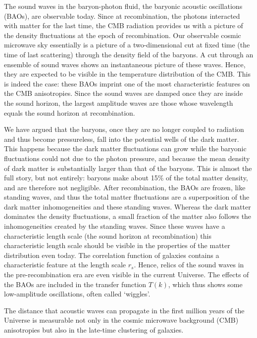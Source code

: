 \documentclass[a4paper,11pt]{article}
\begin{document}
{\noindent}The sound waves in the baryon-photon fluid, the baryonic acoustic oscillations (BAOs), are observable today. Since at recombination, the photons interacted with matter for the last time, the CMB radiation provides us with a picture of the density fluctuations at the epoch of recombination. Our observable cosmic microwave sky essentially is a picture of a two-dimensional cut at fixed time (the time of last scattering) through the density field of the baryons. A cut through an ensemble of sound waves shows an instantaneous picture of these waves. Hence, they are expected to be visible in the temperature distribution of the CMB. This is indeed the case: these BAOs imprint one of the most characteristic features on the CMB anisotropies. Since the sound waves are damped once they are inside the sound horizon, the largest amplitude waves are those whose wavelength equals the sound horizon at recombination.

{\noindent}We have argued that the baryons, once they are no longer coupled to radiation and thus become pressureless, fall into the potential wells of the dark matter. This happens because the dark matter fluctuations can grow while the baryonic fluctuations could not due to the photon pressure, and because the mean density of dark matter is substantially larger than that of the baryons. This is almost the full story, but not entirely: baryons make about 15\% of the total matter density, and are therefore not negligible. After recombination, the BAOs are frozen, like standing waves, and thus the total matter fluctuations are a superposition of the dark matter inhomogeneities and these standing waves. Whereas the dark matter dominates the density fluctuations, a small fraction of the matter also follows the inhomogeneities created by the standing waves. Since these waves have a characteristic length scale (the sound horizon at recombination) this characteristic length scale should be visible in the properties of the matter distribution even today. The correlation function of galaxies contains a characteristic feature at the length scale $r_s$. Hence, relics of the sound waves in the pre-recombination era are even visible in the current Universe. The effects of the BAOs are included in the transfer function $T(k)$, which thus shows some low-amplitude oscillations, often called `wiggles'.

{\noindent}The distance that acoustic waves can propagate in the first million years of the Universe is measurable not only in the cosmic microwave background (CMB) anisotropies but also in the late-time clustering of galaxies.
\end{document}
